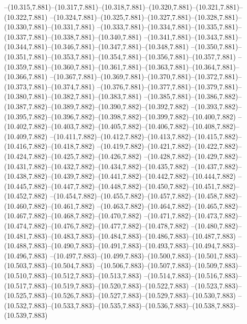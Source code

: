   --(10.315,7.881)--(10.317,7.881)--(10.318,7.881)--(10.320,7.881)--(10.321,7.881)--(10.322,7.881)%
  --(10.324,7.881)--(10.325,7.881)--(10.327,7.881)--(10.328,7.881)--(10.330,7.881)--(10.331,7.881)%
  --(10.333,7.881)--(10.334,7.881)--(10.335,7.881)--(10.337,7.881)--(10.338,7.881)--(10.340,7.881)%
  --(10.341,7.881)--(10.343,7.881)--(10.344,7.881)--(10.346,7.881)--(10.347,7.881)--(10.348,7.881)%
  --(10.350,7.881)--(10.351,7.881)--(10.353,7.881)--(10.354,7.881)--(10.356,7.881)--(10.357,7.881)%
  --(10.359,7.881)--(10.360,7.881)--(10.361,7.881)--(10.363,7.881)--(10.364,7.881)--(10.366,7.881)%
  --(10.367,7.881)--(10.369,7.881)--(10.370,7.881)--(10.372,7.881)--(10.373,7.881)--(10.374,7.881)%
  --(10.376,7.881)--(10.377,7.881)--(10.379,7.881)--(10.380,7.881)--(10.382,7.881)--(10.383,7.881)%
  --(10.385,7.881)--(10.386,7.882)--(10.387,7.882)--(10.389,7.882)--(10.390,7.882)--(10.392,7.882)%
  --(10.393,7.882)--(10.395,7.882)--(10.396,7.882)--(10.398,7.882)--(10.399,7.882)--(10.400,7.882)%
  --(10.402,7.882)--(10.403,7.882)--(10.405,7.882)--(10.406,7.882)--(10.408,7.882)--(10.409,7.882)%
  --(10.411,7.882)--(10.412,7.882)--(10.413,7.882)--(10.415,7.882)--(10.416,7.882)--(10.418,7.882)%
  --(10.419,7.882)--(10.421,7.882)--(10.422,7.882)--(10.424,7.882)--(10.425,7.882)--(10.426,7.882)%
  --(10.428,7.882)--(10.429,7.882)--(10.431,7.882)--(10.432,7.882)--(10.434,7.882)--(10.435,7.882)%
  --(10.437,7.882)--(10.438,7.882)--(10.439,7.882)--(10.441,7.882)--(10.442,7.882)--(10.444,7.882)%
  --(10.445,7.882)--(10.447,7.882)--(10.448,7.882)--(10.450,7.882)--(10.451,7.882)--(10.452,7.882)%
  --(10.454,7.882)--(10.455,7.882)--(10.457,7.882)--(10.458,7.882)--(10.460,7.882)--(10.461,7.882)%
  --(10.463,7.882)--(10.464,7.882)--(10.465,7.882)--(10.467,7.882)--(10.468,7.882)--(10.470,7.882)%
  --(10.471,7.882)--(10.473,7.882)--(10.474,7.882)--(10.476,7.882)--(10.477,7.882)--(10.478,7.882)%
  --(10.480,7.882)--(10.481,7.883)--(10.483,7.883)--(10.484,7.883)--(10.486,7.883)--(10.487,7.883)%
  --(10.488,7.883)--(10.490,7.883)--(10.491,7.883)--(10.493,7.883)--(10.494,7.883)--(10.496,7.883)%
  --(10.497,7.883)--(10.499,7.883)--(10.500,7.883)--(10.501,7.883)--(10.503,7.883)--(10.504,7.883)%
  --(10.506,7.883)--(10.507,7.883)--(10.509,7.883)--(10.510,7.883)--(10.512,7.883)--(10.513,7.883)%
  --(10.514,7.883)--(10.516,7.883)--(10.517,7.883)--(10.519,7.883)--(10.520,7.883)--(10.522,7.883)%
  --(10.523,7.883)--(10.525,7.883)--(10.526,7.883)--(10.527,7.883)--(10.529,7.883)--(10.530,7.883)%
  --(10.532,7.883)--(10.533,7.883)--(10.535,7.883)--(10.536,7.883)--(10.538,7.883)--(10.539,7.883)%
